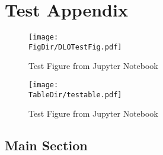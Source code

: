 \documentclass[\econtexRoot/ProjectDLO]{subfiles}
\begin{document}
\let\TableWidth\relax
{\newlength\TableWidth}

\section{Test Appendix}\label{sec:ApndxTest}


\begin{figure}[tbp]
\centerline{\texttt{[image: \\FigDir/DLOTestFig.pdf]}}
\caption{Test Figure from Jupyter Notebook}
\end{figure}

\begin{figure}[tbp]
\centerline{\texttt{[image: \\TableDir/testable.pdf]}}
\caption{Test Figure from Jupyter Notebook}
\end{figure}




\subsection{Main Section}



\onlyinsubfile{\pagebreak}
\end{document}
